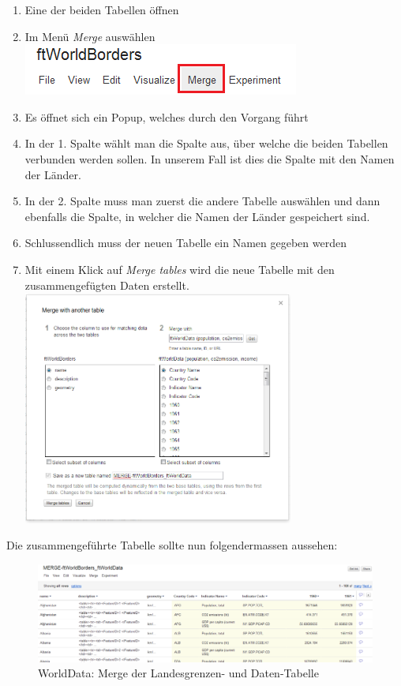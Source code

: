 \begin{enumerate}
\item Eine der beiden Tabellen öffnen
\item Im Menü \emph{Merge} auswählen \\ \includegraphics{images/usecase1-worlddata/documentation/worlddata-merge1}
\item Es öffnet sich ein Popup, welches durch den Vorgang führt
\item In der 1. Spalte wählt man die Spalte aus, über welche die beiden Tabellen verbunden werden sollen. In unserem Fall ist dies die Spalte mit den Namen der Länder.
\item In der 2. Spalte muss man zuerst die andere Tabelle auswählen und dann ebenfalls die Spalte, in welcher die Namen der Länder gespeichert sind.
\item Schlussendlich muss der neuen Tabelle ein Namen gegeben werden
\item Mit einem Klick auf \emph{Merge tables} wird die neue Tabelle mit den zusammengefügten Daten erstellt. \\ \includegraphics[width=0.7\textwidth]{images/usecase1-worlddata/documentation/worlddata-merge2}
\end{enumerate}

Die zusammengeführte Tabelle sollte nun folgendermassen aussehen:

\begin{figure}[H]
	\centering
	\includegraphics[width=\textwidth]{images/usecase1-worlddata/documentation/worlddata-merge_done}
	\caption{WorldData: Merge der Landesgrenzen- und Daten-Tabelle}
	\label{worlddata-merge_done}
\end{figure}

